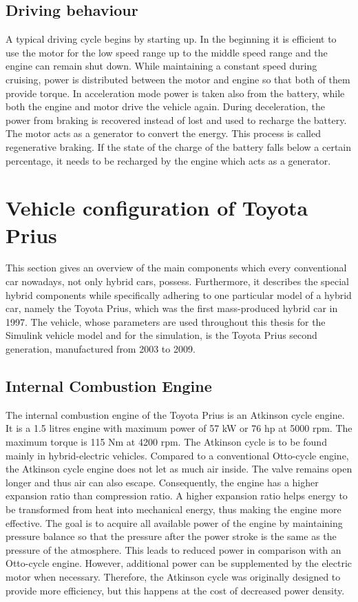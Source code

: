 \subsection{Driving behaviour}
A typical driving cycle begins by starting up. In the beginning it is efficient to use the motor for the low speed range up to the middle speed range and the engine can remain shut down. While maintaining a constant speed during cruising, power is distributed between the motor and engine so that both of them provide torque. In acceleration mode power is taken also from the battery, while both the engine and motor drive the vehicle again. During deceleration, the power from braking is recovered instead of lost and used to recharge the battery. The motor acts as a generator to convert the energy. This process is called regenerative braking. If the state of the charge of the battery falls below a certain percentage, it needs to be recharged by the engine which acts as a generator.

\section{Vehicle configuration of Toyota Prius}
This section gives an overview of the main components which every conventional car nowadays, not only hybrid cars, possess. Furthermore, it describes the special hybrid components while specifically adhering to one particular model of a hybrid car, namely the Toyota Prius, which was the first mass-produced hybrid car in 1997. The vehicle, whose parameters are used throughout this thesis for the Simulink vehicle model and for the simulation, is the Toyota Prius second generation, manufactured from 2003 to 2009.

\subsection{Internal Combustion Engine}
The internal combustion engine of the Toyota Prius is an Atkinson cycle engine. It is a 1.5 litres engine with maximum power of 57 kW or 76 hp at 5000 rpm. The maximum torque is 115 Nm at 4200 rpm. The Atkinson cycle is to be found mainly in hybrid-electric vehicles. Compared to a conventional Otto-cycle engine, the Atkinson cycle engine does not let as much air inside. The valve remains open longer and thus air can also escape. Consequently, the engine has a higher expansion ratio than compression ratio. A higher expansion ratio helps energy to be transformed from heat into mechanical energy, thus making the engine more effective. The goal is to acquire all available power of the engine by maintaining pressure balance so that the pressure after the power stroke is the same as the pressure of the atmosphere. This leads to reduced power in comparison with an Otto-cycle engine. However, additional power can be supplemented by the electric motor when necessary. Therefore, the Atkinson cycle was originally designed to provide more efficiency, but this happens at the cost of decreased power density. 

